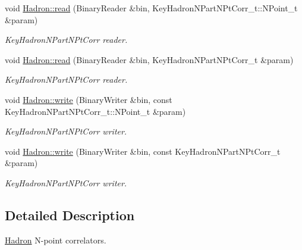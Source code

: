 \begin{DoxyCompactItemize}
void \mbox{\hyperlink{namespaceHadron_a9478eee791b9cb2c8523893a334602e2}{Hadron\+::read}} (Binary\+Reader \&bin, Key\+Hadron\+N\+Part\+N\+Pt\+Corr\+\_\+t\+::\+N\+Point\+\_\+t \&param)
\begin{DoxyCompactList}\small\item\em Key\+Hadron\+N\+Part\+N\+Pt\+Corr reader. \end{DoxyCompactList}\item 
void \mbox{\hyperlink{namespaceHadron_a51412e3f2ebc9c4d67ed1cc397c4d546}{Hadron\+::read}} (Binary\+Reader \&bin, Key\+Hadron\+N\+Part\+N\+Pt\+Corr\+\_\+t \&param)
\begin{DoxyCompactList}\small\item\em Key\+Hadron\+N\+Part\+N\+Pt\+Corr reader. \end{DoxyCompactList}\item 
void \mbox{\hyperlink{namespaceHadron_aef02c5c2c485a766d9e66d0dabe73f62}{Hadron\+::write}} (Binary\+Writer \&bin, const Key\+Hadron\+N\+Part\+N\+Pt\+Corr\+\_\+t\+::\+N\+Point\+\_\+t \&param)
\begin{DoxyCompactList}\small\item\em Key\+Hadron\+N\+Part\+N\+Pt\+Corr writer. \end{DoxyCompactList}\item 
void \mbox{\hyperlink{namespaceHadron_adfbaeaa21e67fb5560f0cf7bddc6ce70}{Hadron\+::write}} (Binary\+Writer \&bin, const Key\+Hadron\+N\+Part\+N\+Pt\+Corr\+\_\+t \&param)
\begin{DoxyCompactList}\small\item\em Key\+Hadron\+N\+Part\+N\+Pt\+Corr writer. \end{DoxyCompactList}\end{DoxyCompactItemize}


\subsection{Detailed Description}
\mbox{\hyperlink{namespaceHadron}{Hadron}} N-\/point correlators. 


